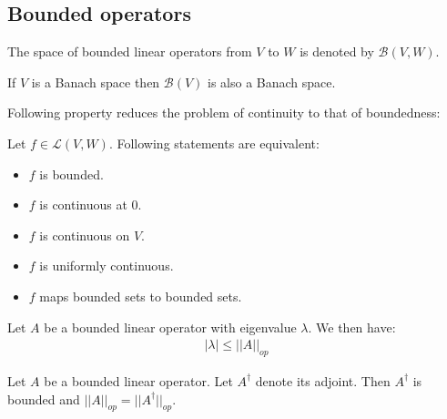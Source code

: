 \subsection{Bounded operators}
	
	\begin{notation}
		The space of bounded linear operators from $V$ to $W$ is denoted by $\mathcal{B}(V, W)$.
	\end{notation}
	\begin{property}
		If $V$ is a Banach space then $\mathcal{B}(V)$ is also a Banach space.
	\end{property}
	
	Following property reduces the problem of continuity to that of boundedness:
	\begin{property}
		Let $f\in\mathcal{L}(V, W)$. Following statements are equivalent:
		\begin{itemize}
			\item $f$ is bounded.
			\item $f$ is continuous at 0.
			\item $f$ is continuous on $V$.
			\item $f$ is uniformly continuous.
			\item $f$ maps bounded sets to bounded sets.
		\end{itemize}
	\end{property}

	\begin{property}
		Let $A$ be a bounded linear operator with eigenvalue $\lambda$. We then have:
		\begin{gather}
			|\lambda|\leq||A||_{op}
		\end{gather}
	\end{property}
	\begin{property}
		Let $A$ be a bounded linear operator. Let $A^\dag$ denote its adjoint\footnotemark. Then $A^\dag$ is bounded and $||A||_{op} = ||A^\dag||_{op}$.
	\end{property}


